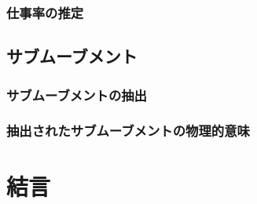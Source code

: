 %
\clearpage
\subsubsection{仕事率の推定}
\clearpage
\subsection{サブムーブメント}
\subsubsection{サブムーブメントの抽出}
\subsubsection{抽出されたサブムーブメントの物理的意味}
\section{結言}

